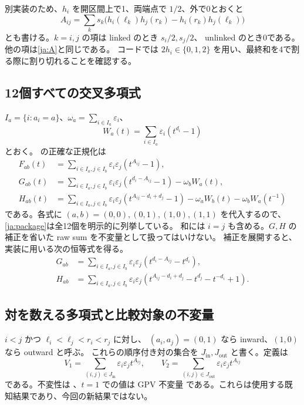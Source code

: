 \documentclass[12pt]{amsart}
\theoremstyle{definition}
\theoremstyle{remark}
\numberwithin{equation}{section}
\newcommand{\Jin}{J_{\mathrm{in}}}
\newcommand{\Jout}{J_{\mathrm{out}}}
\newcommand{\eps}{\varepsilon}
\begin{document}
別実装のため、$h_i$ を開区間上で1、両端点で $1/2$、外で0とおくと
\begin{equation}\label{ja:half}
A_{ij}=\sum_k s_k\bigl(h_i(\ell_k)h_j(r_k)-h_i(r_k)h_j(\ell_k)\bigr)
\end{equation}
とも書ける。$k=i,j$ の項は linked のとき $s_i/2,s_j/2$、
unlinked のとき0である。他の項は\eqref{ja:A}と同じである。
コードでは $2h_i\in\{0,1,2\}$ を用い、最終和を4で割る際に割り切れることを確認する。

\subsection{12個すべての交叉多項式}
$I_a=\{i:a_i=a\}$、$\omega_a=\sum_{i\in I_a}\eps_i$、
\[
W_a(t)=\sum_{i\in I_a}\eps_i(t^{d_i}-1)
\]
とおく。\cite[Theorem 2.3]{NNSW1} の正確な正規化は
\begin{align}
F_{ab}(t)&=\sum_{i\in I_a,j\in I_b}\eps_i\eps_j(t^{A_{ij}}-1),\label{ja:F}\\
G_{ab}(t)&=\sum_{i\in I_a,j\in I_b}\eps_i\eps_j(t^{d_i-A_{ij}}-1)
-\omega_bW_a(t),\label{ja:G}\\
H_{ab}(t)&=\sum_{i\in I_a,j\in I_b}\eps_i\eps_j(t^{A_{ij}-d_i+d_j}-1)
-\omega_aW_b(t)-\omega_bW_a(t^{-1})\label{ja:H}
\end{align}
である。各式に $(a,b)=(0,0),(0,1),(1,0),(1,1)$ を代入するので、
\eqref{ja:package}は全12個を明示的に列挙している。
和には $i=j$ も含める。$G,H$ の補正を省いた raw sum を不変量として扱ってはいけない。
補正を展開すると、実装に用いる次の恒等式を得る。
\begin{align}
G_{ab}&=\sum_{i\in I_a,j\in I_b}\eps_i\eps_j
(t^{d_i-A_{ij}}-t^{d_i}),\label{ja:Gfast}\\
H_{ab}&=\sum_{i\in I_a,j\in I_b}\eps_i\eps_j
(t^{A_{ij}-d_i+d_j}-t^{d_j}-t^{-d_i}+1).\label{ja:Hfast}
\end{align}

\subsection{対を数える多項式と比較対象の不変量}
$i<j$ かつ $\ell_i<\ell_j<r_i<r_j$ に対し、
$(a_i,a_j)=(0,1)$ なら inward、$(1,0)$ なら outward と呼ぶ。
これらの順序付き対の集合を $\Jin,\Jout$ と書く。定義は
\begin{equation}\label{ja:V}
V_1=\sum_{(i,j)\in\Jin}\eps_i\eps_jt^{A_{ij}},\qquad
V_2=\sum_{(i,j)\in\Jout}\eps_i\eps_jt^{A_{ij}}
\end{equation}
である。不変性は \cite[Theorem 3.1]{SW}、$t=1$ での値は GPV 不変量
\cite[\S3.2]{GPV} である。これらは使用する既知結果であり、今回の新結果ではない。
\end{document}
